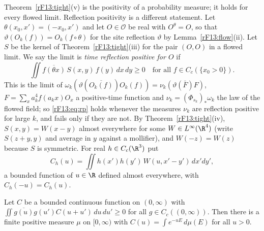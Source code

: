 Theorem~\ref{rF13:tight}(v) is the positivity of a probability measure; it
holds for every flowed limit. Reflection positivity is a different
statement. Let $\theta(x_0,x')=(-x_0,x')$ and let $O\in\mathcal O$ be real
with $O^\theta=O$, so that $\vartheta(O_k(f))=O_k(f\circ\theta)$ for the site
reflection $\vartheta$ by Lemma~\ref{rF13:flow}(ii). Let $S$ be the kernel of
Theorem~\ref{rF13:tight}(iii) for the pair $(O,O)$ in a flowed limit. We say
the limit is \emph{time reflection positive for $O$} if
\begin{equation}\label{rF13:eq:rp}
\iint\overline{f(\theta x)}\,S(x,y)\,f(y)\,dx\,dy\ge0
\quad\text{for all }f\in C_c(\{x_0>0\}) .
\end{equation}
This is the limit of $\omega_k(\vartheta(\overline{O_k(f)})O_k(f))=\nu_k(
\vartheta(\bar F)F)$, $F=\sum_xa_k^4f(a_kx)O_x$ a positive-time function and
$\nu_k=(\Phi_{s_k})_*\omega_k$ the law of the flowed field; so
\eqref{rF13:eq:rp} holds whenever the measures $\nu_k$ are reflection positive
for large $k$, and fails only if they are not. By
Theorem~\ref{rF13:tight}(iv), $S(x,y)=W(x-y)$ almost everywhere for some
$W\in L^\infty(\R^4)$ (write $S(z+y,y)$ and average in $y$ against a
mollifier), and $W(-z)=W(z)$ because $S$ is symmetric. For real $h\in
C_c(\R^3)$ put
\[
C_h(u)=\iint h(x')h(y')\,W(u,x'-y')\,dx'dy' ,
\]
a bounded function of $u\in\R$ defined almost everywhere, with
$C_h(-u)=C_h(u)$.

\begin{lemma}\label{rF13:laplace}
Let $C$ be a bounded continuous function on $(0,\infty)$ with
$\iint\overline{g(u)}g(u')C(u+u')\,du\,du'\ge0$ for all $g\in C_c((0,\infty))$.
Then there is a finite positive measure $\mu$ on $[0,\infty)$ with
$C(u)=\int e^{-uE}\,d\mu(E)$ for all $u>0$.
\end{lemma}

